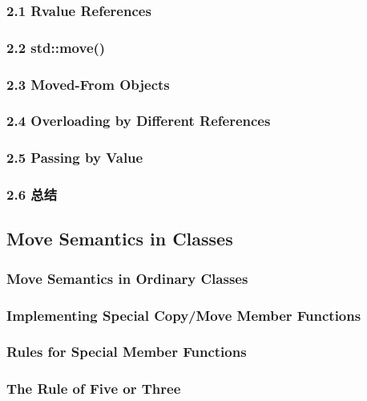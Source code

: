 \documentclass[11pt,a4paper,UTF8]{ctexart}
\begin{document}
		\subsubsection{2.1 Rvalue References}
		
		\subsubsection{2.2 std::move()}
		
		\subsubsection{2.3 Moved-From Objects}
		
		\subsubsection{2.4 Overloading by Different References}
		
		\subsubsection{2.5 Passing by Value}
		
		\subsubsection{2.6 总结}
		
	\subsection{Move Semantics in Classes}
		\subsubsection{Move Semantics in Ordinary Classes}
		\subsubsection{Implementing Special Copy/Move Member Functions}
		\subsubsection{Rules for Special Member Functions}
		\subsubsection{The Rule of Five or Three}
\end{document}
